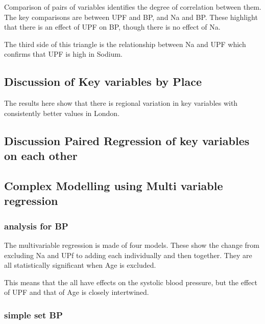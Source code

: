 \documentclass[
]{article}
\begin{document}
Comparison of pairs of variables identifies the degree of correlation
between them. The key comparisons are between UPF and BP, and Na and BP.
These highlight that there is an effect of UPF on BP, though there is no
effect of Na.

The third side of this triangle is the relationship between Na and UPF
which confirms that UPF is high in Sodium.

\hypertarget{discussion-of-key-variables-by-place}{%
\subsection{Discussion of Key variables by
Place}\label{discussion-of-key-variables-by-place}}

The results here show that there is regional variation in key variables
with consistently better values in London.

\hypertarget{discussion-paired-regression-of-key-variables-on-each-other}{%
\subsection{Discussion Paired Regression of key variables on each
other}\label{discussion-paired-regression-of-key-variables-on-each-other}}

\hypertarget{complex-modelling-using-multi-variable-regression-1}{%
\subsection{Complex Modelling using Multi variable
regression}\label{complex-modelling-using-multi-variable-regression-1}}

\hypertarget{analysis-for-bp}{%
\subsubsection{analysis for BP}\label{analysis-for-bp}}

The multivariable regression is made of four models. These show the
change from excluding Na and UPf to adding each individually and then
together. They are all statistically significant when Age is excluded.

This means that the all have effects on the systolic blood pressure, but
the effect of UPF and that of Age is closely intertwined.

\hypertarget{simple-set-bp}{%
\subsubsection{simple set BP}\label{simple-set-bp}}
\end{document}
